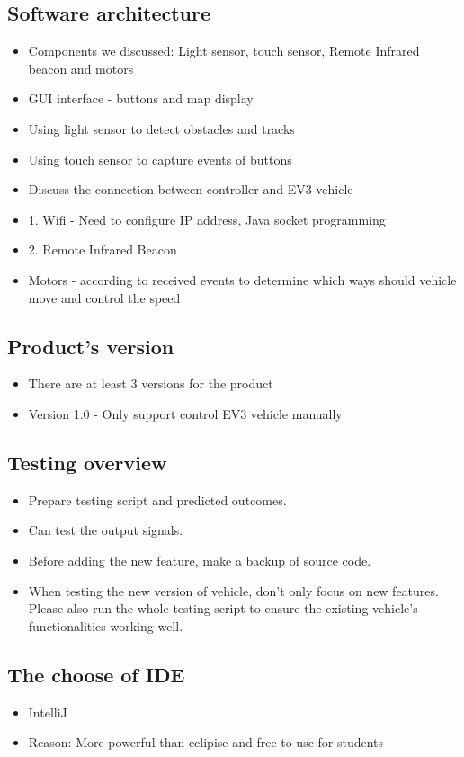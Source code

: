 \documentclass[11pt, a4paper]{article}
\begin{document}
\subsection{Software architecture}
\begin{itemize}
\item Components we discussed: Light sensor, touch sensor, Remote Infrared beacon and motors
\item GUI interface - buttons and map display
\item Using light sensor to detect obstacles and tracks
\item Using touch sensor to capture events of buttons
\item Discuss the connection between controller and EV3 vehicle
\item  1. Wifi - Need to configure IP address, Java socket programming
\item  2. Remote Infrared Beacon
\item Motors - according to received events to determine which ways should vehicle move and control the speed 
\end{itemize}

\subsection{Product's version}
\begin{itemize}
\item There are at least 3 versions for the product
\item Version 1.0 - Only support control EV3 vehicle manually
\end{itemize}

\subsection{Testing overview}
\begin{itemize}
\item Prepare testing script and predicted outcomes.
\item Can test the output signals.
\item Before adding the new feature, make a backup of source code.
\item When testing the new version of vehicle, don't only focus on new features. Please also run the whole testing script to ensure the existing vehicle's functionalities working well. 
\end{itemize}

\subsection{The choose of IDE}
\begin{itemize}
\item IntelliJ
\item Reason: More powerful than eclipise and free to use for students
\end{itemize}
\end{document}
